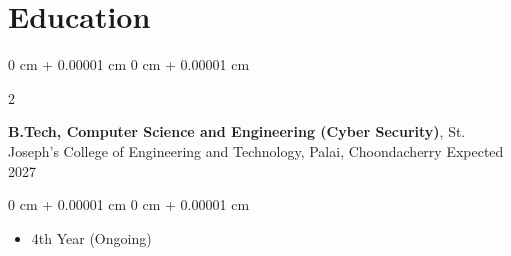 \documentclass[10pt, a4paper]{article}
\newenvironment{highlights}{
    \begin{itemize}[
        topsep=0.10 cm,
        parsep=0.10 cm,
        partopsep=0pt,
        itemsep=0pt,
        leftmargin=0 cm + 10pt
    ]
}{
    \end{itemize}
} %
\newenvironment{onecolentry}{
    \begin{adjustwidth}{
        0 cm + 0.00001 cm
    }{
        0 cm + 0.00001 cm
    }
}{
    \end{adjustwidth}
} %
\newenvironment{twocolentry}[2][]{
    \onecolentry
    \def\secondColumn{#2}
    \setcolumnwidth{\fill, 4.5 cm}
    \begin{paracol}{2}
}{
    \switchcolumn \raggedleft \secondColumn
    \end{paracol}
    \endonecolentry
} %
\begin{document}
    \section{Education}
     
        \begin{twocolentry}{
            Expected 2027
        }
            \textbf{B.Tech, Computer Science and Engineering (Cyber Security)}, St. Joseph's College of Engineering and Technology, Palai, Choondacherry\end{twocolentry}

        \vspace{0.10 cm}
        \begin{onecolentry}
            \begin{highlights}
                \item 4th Year (Ongoing)
            \end{highlights}
        \end{onecolentry}
\end{document}
